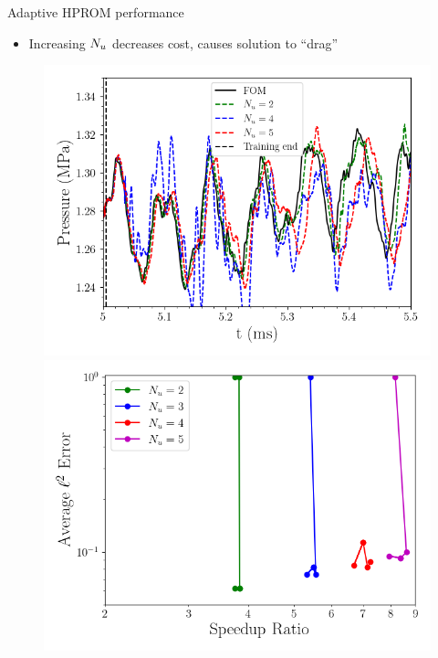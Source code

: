 \documentclass[]{beamer}
\begin{document}
\begin{frame}{Adaptive HPROM performance}
	\begin{itemize}
		\item Increasing $N_u$ decreases cost, causes solution to ``drag''
	\end{itemize}
	\begin{figure}
		\begin{minipage}{0.49\linewidth}
			\includegraphics[width=0.99\linewidth]{Images/experiments/cvrc/pressure_probe_wrt_iter.png}
		\end{minipage}
		\begin{minipage}{0.49\linewidth}
			\includegraphics[width=0.99\linewidth]{Images/experiments/cvrc/pareto_wrt_iters_Average_errorRaw_pareto.png}
		\end{minipage}
	\end{figure}

\end{frame}
\end{document}
